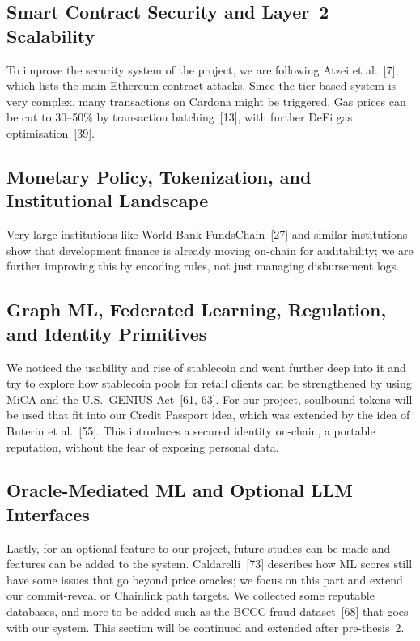 \documentclass[12pt, a4paper]{report}
\begin{document}
\subsection{Smart Contract Security and Layer~2 Scalability}

To improve the security system of the project, we are following Atzei et al.~[7], which lists the main Ethereum contract attacks. Since the tier-based system is very complex, many transactions on Cardona might be triggered. Gas prices can be cut to 30--50\% by transaction batching~[13], with further DeFi gas optimisation~[39].

\subsection{Monetary Policy, Tokenization, and Institutional Landscape}
\label{sec:lit-institutional}

Very large institutions like World Bank FundsChain~[27] and similar institutions show that development finance is already moving on-chain for auditability; we are further improving this by encoding rules, not just managing disbursement logs.

\subsection{Graph ML, Federated Learning, Regulation, and Identity Primitives}

We noticed the usability and rise of stablecoin and went further deep into it and try to explore how stablecoin pools for retail clients can be strengthened by using MiCA and the U.S.\ GENIUS Act~[61, 63]. For our project, soulbound tokens will be used that fit into our Credit Passport idea, which was extended by the idea of Buterin et al.~[55]. This introduces a secured identity on-chain, a portable reputation, without the fear of exposing personal data.

\subsection{Oracle-Mediated ML and Optional LLM Interfaces}
\label{sec:lit-llm}

Lastly, for an optional feature to our project, future studies can be made and features can be added to the system. Caldarelli~[73] describes how ML scores still have some issues that go beyond price oracles; we focus on this part and extend our commit-reveal or Chainlink path targets. We collected some reputable databases, and more to be added such as the BCCC fraud dataset~[68] that goes with our system. This section will be continued and extended after pre-thesis~2.
\end{document}
